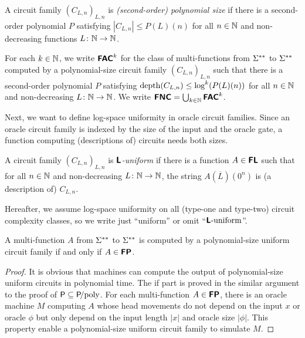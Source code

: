 \documentclass[envcountsame,orivec,oribibl]{llncs}
\begin{document}
A circuit family $(C_{L,n})_{L,n}$ is \emph{(second-order) polynomial size}
if there is a second-order polynomial $P$ satisfying
$|C_{L,n}| \le P(L)(n)$ for all $n \in \mathbb N$ and non-decreasing functions
$L \colon \mathbb N \to \mathbb N$.

\begin{definition}
 For each $k \in \mathbb N$, 
 we write $\text{\bfseries \sffamily \upshape FAC}^k$ for the class of 
 multi-functions from $\Sigma ^{**}$ to $\Sigma ^{**}$ computed by
 a polynomial-size circuit family $(C_{L,n})_{L,n}$ such that
 there is a second-order polynomial $P$ satisfying
 $\mathop{\rm depth}(C_{L,n}) \le \log^k(P(L)(n))$ 
 for all $n \in \mathbb N$ and non-decreasing
 $L \colon \mathbb N \to \mathbb N$.
 We write $\text{\bfseries \sffamily \upshape FNC} = \bigcup_{k \in \mathbb N} \text{\bfseries \sffamily \upshape FAC}^k$.
\end{definition}

Next, we want to define log-space uniformity in oracle circuit families.
Since an oracle circuit family is indexed by the size of the input and the oracle gate,
a function computing (descriptions of) circuits needs both sizes.

\begin{definition}[uniformity]
A circuit family $(C_{L,n})_{L,n}$ is \emph{$\text{\bfseries \sffamily \upshape L}$-uniform} if there is a function $A \in \text{\bfseries \sffamily \upshape FL}$ 
such that for all $n \in \mathbb N$ and non-decreasing $L \colon \mathbb N \to \mathbb N$, 
the string $A (\overline L) (0^n)$ is (a description of) $C_{L,n}$. 
\end{definition}

Hereafter, we assume log-space uniformity on all (type-one and type-two) 
circuit complexity classes, so we write just ``uniform'' or omit ``$\text{\bfseries \sffamily \upshape L}\text{-uniform}$''.

\begin{theorem}
\label{theorem:P-equals-L-uniform-P-poly}
A multi-function $A$ from $\Sigma ^{**}$ to $\Sigma ^{**}$ is computed by a polynomial-size
uniform circuit family if and only if $A \in \text{\bfseries \sffamily \upshape FP}$.
\end{theorem}

\begin{proof}
 It is obvious that machines can compute the output of
 polynomial-size uniform circuits in polynomial time.
 The if part is proved in the similar argument to the proof of
 $\mathsf{P} \subseteq \mathsf{P}\!\text{/poly}$.
 For each multi-function $A \in \text{\bfseries \sffamily \upshape FP}$, there is an oracle machine $M$
 computing $A$ whose head movements do not depend on the input $x$ or oracle
 $\phi$ but only depend on the input length $|x|$ and oracle size $|\phi|$.
 This property enable a polynomial-size uniform circuit family to simulate $M$.
\end{proof}
\end{document}
